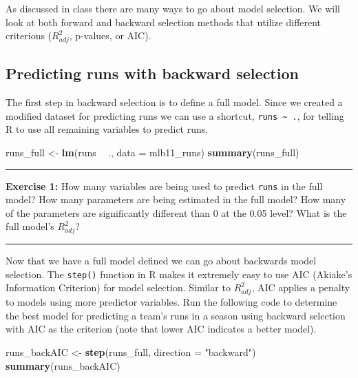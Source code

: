 \documentclass[]{book}
\newenvironment{Shaded}{\begin{snugshade}}{\end{snugshade}}
\newcommand{\DataTypeTok}[1]{\textcolor[rgb]{0.13,0.29,0.53}{#1}}
\newcommand{\KeywordTok}[1]{\textcolor[rgb]{0.13,0.29,0.53}{\textbf{#1}}}
\newcommand{\NormalTok}[1]{#1}
\newcommand{\OperatorTok}[1]{\textcolor[rgb]{0.81,0.36,0.00}{\textbf{#1}}}
\newcommand{\StringTok}[1]{\textcolor[rgb]{0.31,0.60,0.02}{#1}}
\theoremstyle{definition}
\theoremstyle{definition}
\theoremstyle{definition}
\theoremstyle{remark}
\begin{document}
As discussed in class there are many ways to go about model selection.
We will look at both forward and backward selection methods that utilize
different criterions (\(R^2_{adj}\), p-values, or AIC).

\hypertarget{predicting-runs-with-backward-selection}{%
\subsection{Predicting runs with backward
selection}\label{predicting-runs-with-backward-selection}}

The first step in backward selection is to define a full model. Since we
created a modified dataset for predicting runs we can use a shortcut,
\texttt{runs\ \textasciitilde{}\ .}, for telling R to use all remaining
variables to predict runs.

\begin{Shaded}
\begin{Highlighting}[]
\NormalTok{runs_full <-}\StringTok{ }\KeywordTok{lm}\NormalTok{(runs }\OperatorTok{~}\StringTok{ }\NormalTok{., }\DataTypeTok{data =}\NormalTok{ mlb11_runs)}
\KeywordTok{summary}\NormalTok{(runs_full)}
\end{Highlighting}
\end{Shaded}

\begin{center}\rule{0.5\linewidth}{\linethickness}\end{center}

\textbf{Exercise 1:} How many variables are being used to predict
\texttt{runs} in the full model? How many parameters are being estimated
in the full model? How many of the parameters are significantly
different than 0 at the 0.05 level? What is the full model's
\(R^2_{adj}\)?

\begin{center}\rule{0.5\linewidth}{\linethickness}\end{center}

Now that we have a full model defined we can go about backwards model
selection. The \texttt{step()} function in R makes it extremely easy to
use AIC (Akiake's Information Criterion) for model selection. Similar to
\(R^2_{adj}\), AIC applies a penalty to models using more predictor
variables. Run the following code to determine the best model for
predicting a team's runs in a season using backward selection with AIC
as the criterion (note that lower AIC indicates a better model).

\begin{Shaded}
\begin{Highlighting}[]
\NormalTok{runs_backAIC <-}\StringTok{ }\KeywordTok{step}\NormalTok{(runs_full, }\DataTypeTok{direction =} \StringTok{"backward"}\NormalTok{)}
\KeywordTok{summary}\NormalTok{(runs_backAIC)}
\end{Highlighting}
\end{Shaded}
\end{document}
